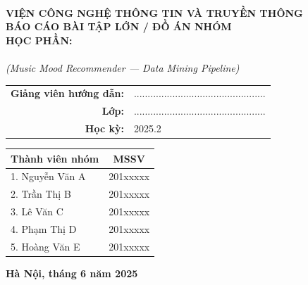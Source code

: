 \begin{titlepage}
  \thispagestyle{empty}
  \begin{center}
    \textbf{\HUST}\\[0.4em]
    \textbf{VIỆN CÔNG NGHỆ THÔNG TIN VÀ TRUYỀN THÔNG}\\[2.5em]

    {\Large \textbf{BÁO CÁO BÀI TẬP LỚN / ĐỒ ÁN NHÓM}}\\[0.8em]
    {\large \textbf{HỌC PHẦN: \course}}\\[2.5em]

    {\LARGE \textbf{\projecttitle}}\\[0.6em]
    {\large \textit{(Music Mood Recommender --- Data Mining Pipeline)}}\\[3em]

    \begin{tabular}{rl}
      \textbf{Giảng viên hướng dẫn:} & ................................................ \\
      \textbf{Lớp:} & ................................................ \\
      \textbf{Học kỳ:} & 2025.2 \\
    \end{tabular}

    \vfill

    \begin{tabular}{p{} c}
      \textbf{Thành viên nhóm} & \textbf{MSSV} \\
      \hline
      1. Nguyễn Văn A & 201xxxxx \\
      2. Trần Thị B & 201xxxxx \\
      3. Lê Văn C & 201xxxxx \\
      4. Phạm Thị D & 201xxxxx \\
      5. Hoàng Văn E & 201xxxxx \\
    \end{tabular}

    \vfill
    \textbf{Hà Nội, tháng 6 năm 2025}
  \end{center}
\end{titlepage}
